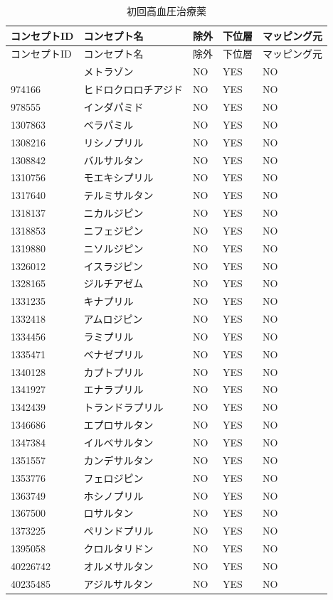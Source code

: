 \documentclass[
  11pt]{book}
\theoremstyle{definition}
\theoremstyle{definition}
\theoremstyle{definition}
\theoremstyle{definition}
\theoremstyle{remark}
\begin{document}
\begin{longtable}[]{@{}lllll@{}}
\caption{\label{tab:HTN1yrFO1stLine} 初回高血圧治療薬}\tabularnewline
\toprule\noalign{}
コンセプトID & コンセプト名 & 除外 & 下位層 & マッピング元 \\
\midrule\noalign{}
\endfirsthead
\toprule\noalign{}
コンセプトID & コンセプト名 & 除外 & 下位層 & マッピング元 \\
\midrule\noalign{}
\endhead
\bottomrule\noalign{}
\endlastfoot
907013 & メトラゾン & NO & YES & NO \\
974166 & ヒドロクロロチアジド & NO & YES & NO \\
978555 & インダパミド & NO & YES & NO \\
1307863 & ベラパミル & NO & YES & NO \\
1308216 & リシノプリル & NO & YES & NO \\
1308842 & バルサルタン & NO & YES & NO \\
1310756 & モエキシプリル & NO & YES & NO \\
1317640 & テルミサルタン & NO & YES & NO \\
1318137 & ニカルジピン & NO & YES & NO \\
1318853 & ニフェジピン & NO & YES & NO \\
1319880 & ニソルジピン & NO & YES & NO \\
1326012 & イスラジピン & NO & YES & NO \\
1328165 & ジルチアゼム & NO & YES & NO \\
1331235 & キナプリル & NO & YES & NO \\
1332418 & アムロジピン & NO & YES & NO \\
1334456 & ラミプリル & NO & YES & NO \\
1335471 & ベナゼプリル & NO & YES & NO \\
1340128 & カプトプリル & NO & YES & NO \\
1341927 & エナラプリル & NO & YES & NO \\
1342439 & トランドラプリル & NO & YES & NO \\
1346686 & エプロサルタン & NO & YES & NO \\
1347384 & イルベサルタン & NO & YES & NO \\
1351557 & カンデサルタン & NO & YES & NO \\
1353776 & フェロジピン & NO & YES & NO \\
1363749 & ホシノプリル & NO & YES & NO \\
1367500 & ロサルタン & NO & YES & NO \\
1373225 & ペリンドプリル & NO & YES & NO \\
1395058 & クロルタリドン & NO & YES & NO \\
40226742 & オルメサルタン & NO & YES & NO \\
40235485 & アジルサルタン & NO & YES & NO \\
\end{longtable}
\end{document}
